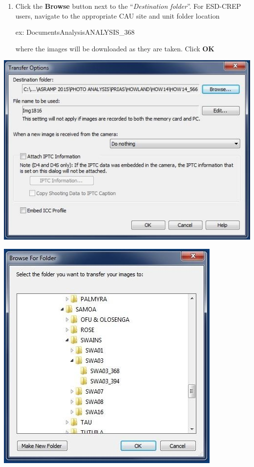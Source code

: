 \documentclass[
]{book}
\begin{document}
\begin{enumerate}
\def\labelenumi{\arabic{enumi}.}
\setcounter{enumi}{7}
\item
  Click the \textbf{Browse} button next to the ``\emph{Destination folder}''. For ESD-CREP users, navigate to the appropriate CAU site and unit folder location

  ex: Documents\CAU Analysis\PHOTO ANALYSIS\SAMOA\SWAINS{}\_368

  where the images will be downloaded as they are taken. Click \textbf{OK}
\end{enumerate}

\includegraphics{images/Camera12.jpg}

\includegraphics{images/Camera13.jpg}
\end{document}
